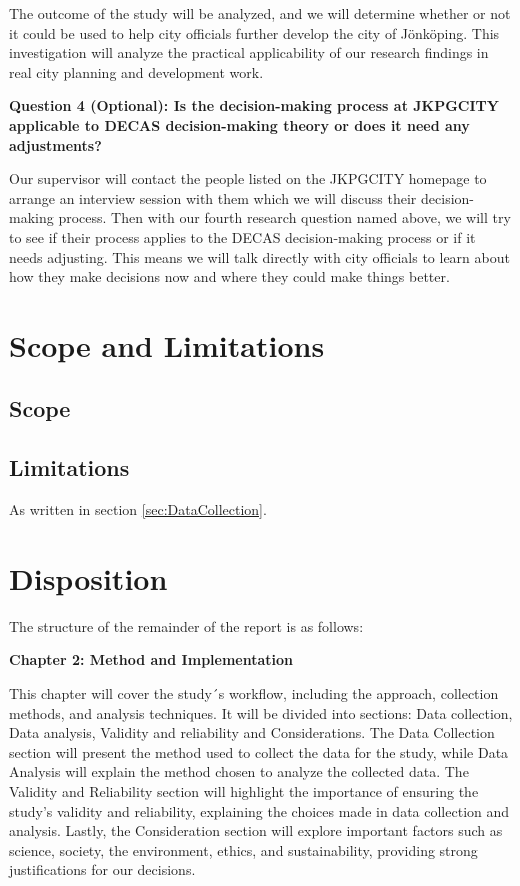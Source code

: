 The outcome of the study will be analyzed, and we will determine whether or not it could be used to help city officials further develop the city of Jönköping. This investigation will analyze the practical applicability of our research findings in real city planning and development work.



\textbf{Question 4 (Optional): Is the decision-making process at JKPGCITY applicable to DECAS decision-making theory or does it need any adjustments?  }


Our supervisor will contact the people listed on the JKPGCITY homepage to arrange an interview session with them which we will discuss their decision-making process. Then with our fourth research question named above, we will try to see if their process applies to the DECAS decision-making process or if it needs adjusting. This means we will talk directly with city officials to learn about how they make decisions now and where they could make things better.




\section{Scope and Limitations}

\subsection{Scope}

\subsection{Limitations}
As written in section \ref{sec:DataCollection}.


\section{Disposition}
The structure of the remainder of the report is as follows: 

\textbf{Chapter 2: Method and Implementation}

This chapter will cover the study´s workflow, including the approach, collection methods, and analysis techniques. It will be divided into sections: Data collection, Data analysis, Validity and reliability and Considerations. The Data Collection section will present the method used to collect the data for the study, while Data Analysis will explain the method chosen to analyze the collected data. The Validity and Reliability section will highlight the importance of ensuring the study’s validity and reliability, explaining the choices made in data collection and analysis. Lastly, the Consideration section will explore important factors such as science, society, the environment, ethics, and sustainability, providing strong justifications for our decisions.




